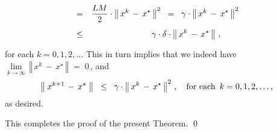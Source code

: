\begin{enumerate}
\begin{eqnarray*}
	&=&
		\dfrac{L M}{2}
		\cdot
		\left\Vert\,x^{k} \,-\, x^{\star}\,\right\Vert^{2}
	\;\; = \;\;
		\gamma \cdot \left\Vert\,x^{k} \,-\, x^{\star}\,\right\Vert^{2}
	\\
	&\leq&
		\gamma \cdot \delta
		\cdot
		\left\Vert\,x^{k} \,-\, x^{\star}\,\right\Vert\,,
		{\color{white}\dfrac{LM}{2}}
	\end{eqnarray*}
	for each $k = 0,1,2,\ldots$
	This in turn implies that we indeed have
	$\underset{k\rightarrow\infty}{\lim}\,\left\Vert\,x^{k} \,-\, x^{\star}\,\right\Vert \;=\; 0$\,,
	and
	\begin{equation*}
	\left\Vert\;x^{k+1} \,-\, x^{\star}\;\right\Vert \;\; \leq \;\; \gamma \cdot \left\Vert\,x^{k} \,-\, x^{\star}\,\right\Vert^{2}\,,
	\quad
	\textnormal{for each \,$k = 0, 1, 2, \ldots$}\,,
	\end{equation*}
	as desired.
\end{enumerate}
This completes the proof of the present Theorem.
\qed



\renewcommand{\theenumi}{\roman{enumi}}
\renewcommand{\labelenumi}{\textnormal{(\theenumi)}$\;\;$}

